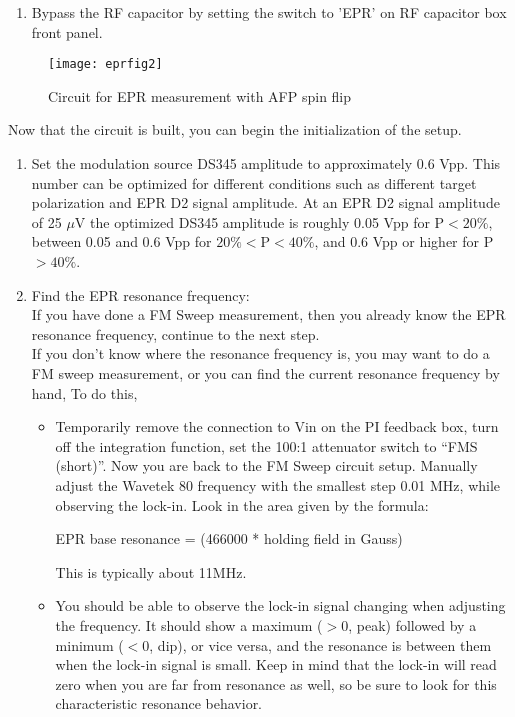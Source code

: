 {\begin{enumerate}
\item Bypass the RF capacitor by setting the switch to 'EPR' 
on RF capacitor box front panel.
\end{enumerate}

\begin{figure}
\begin{center}
\centerline{ \texttt{[image: eprfig2]}}
\caption{Circuit for EPR measurement with AFP spin flip}
\end{center}
\label{fig2:epr}
\end{figure}


Now that the circuit is built, you can begin the initialization of the
setup.

\begin{enumerate}

\item Set the modulation source DS345 amplitude to approximately 0.6 Vpp.  
This number can be optimized for different conditions such as different 
target polarization and EPR D2 signal amplitude.  At an EPR D2 signal amplitude
of 25 $\mu$V the optimized DS345 amplitude is roughly 0.05 Vpp for P$< 20\%$, 
between 0.05 and 0.6 Vpp for $20\%<$P$<40\%$, and 0.6 Vpp or higher for 
P$> 40\% $.

\item Find the EPR resonance frequency:\\

If you have done a FM Sweep measurement, then you already know the
EPR resonance frequency, continue to the next step.\\

If you don't know where the resonance frequency is, you may want to do 
a FM sweep measurement, or you can 
find the current resonance frequency by hand,
To do this, 
\begin{itemize}
\item Temporarily remove the
connection to Vin on the PI feedback box, turn off the integration
function, set the 100:1 attenuator switch to ``FMS (short)''.  Now you are back to the FM Sweep circuit setup.
Manually adjust the Wavetek 80
frequency with the smallest step 0.01 MHz, 
while observing the lock-in.  Look in the area
given by the formula:                                                                                       

EPR base resonance = (466000 * holding field in Gauss) 

This is typically about 11MHz.

\item You should be able to observe the lock-in signal changing 
when adjusting the frequency.  It should show a maximum ($>$0, peak) followed
by a minimum ($<$0, dip), or vice versa, and the resonance is between them
when the lock-in signal is small.  Keep in mind that the lock-in will
read zero when you are far from resonance
as well, so be sure to look for this characteristic resonance behavior. 


\end{itemize}
\end{enumerate}}
